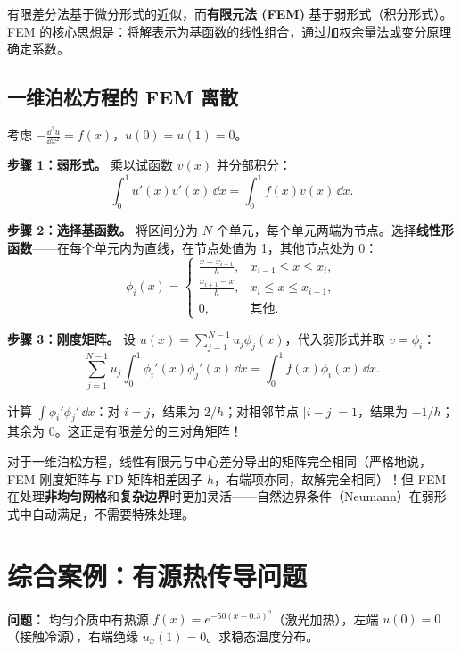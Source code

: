 有限差分法基于微分形式的近似，而\textbf{有限元法 (FEM)} 基于弱形式（积分形式）。FEM 的核心思想是：将解表示为基函数的线性组合，通过加权余量法或变分原理确定系数。

\subsection{一维泊松方程的 FEM 离散}

考虑 $-\frac{\dd^2 u}{\dd x^2} = f(x)$，$u(0)=u(1)=0$。

\textbf{步骤 1：弱形式。} 乘以试函数 $v(x)$ 并分部积分：
\begin{equation}
\int_0^1 u'(x)v'(x)\,\dd x = \int_0^1 f(x)v(x)\,\dd x.
\end{equation}

\textbf{步骤 2：选择基函数。} 将区间分为 $N$ 个单元，每个单元两端为节点。选择\textbf{线性形函数}——在每个单元内为直线，在节点处值为 1，其他节点处为 0：
\begin{equation}
\phi_i(x) = \begin{cases}
\frac{x - x_{i-1}}{h}, & x_{i-1} \leq x \leq x_i,\\
\frac{x_{i+1} - x}{h}, & x_i \leq x \leq x_{i+1},\\
0, & \text{其他}.
\end{cases}
\end{equation}

\textbf{步骤 3：刚度矩阵。} 设 $u(x) = \sum_{j=1}^{N-1} u_j \phi_j(x)$，代入弱形式并取 $v = \phi_i$：
\begin{equation}
\sum_{j=1}^{N-1} u_j \int_0^1 \phi_i'(x)\phi_j'(x)\,\dd x = \int_0^1 f(x)\phi_i(x)\,\dd x.
\end{equation}

计算 $\int \phi_i'\phi_j'\,\dd x$：对 $i=j$，结果为 $2/h$；对相邻节点 $|i-j|=1$，结果为 $-1/h$；其余为 0。这正是有限差分的三对角矩阵！

\begin{insight}
对于一维泊松方程，线性有限元与中心差分导出的矩阵完全相同（严格地说，FEM 刚度矩阵与 FD 矩阵相差因子 $h$，右端项亦同，故解完全相同）！但 FEM 在处理\textbf{非均匀网格}和\textbf{复杂边界}时更加灵活——自然边界条件（Neumann）在弱形式中自动满足，不需要特殊处理。
\end{insight}

\section{综合案例：有源热传导问题}

\textbf{问题：} 均匀介质中有热源 $f(x) = e^{-50(x-0.3)^2}$（激光加热），左端 $u(0)=0$（接触冷源），右端绝缘 $u_x(1)=0$。求稳态温度分布。

